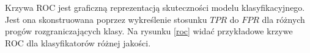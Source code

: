 \documentclass[a4paper, twoside, 11pt, openright]{article}
\begin{document}
Krzywa ROC jest graficzną reprezentacją skuteczności modelu klasyfikacyjnego. Jest ona skonstruowana poprzez wykreślenie stosunku $TPR$ do $FPR$ dla różnych progów rozgraniczających klasy. Na rysunku \ref{roc} widać przykładowe krzywe ROC dla klasyfikatorów różnej jakości.


\begin{figure}[H]%
\centering
{}%
\qquad
{}%
\qquad
{}%

\end{figure}
\end{document}
